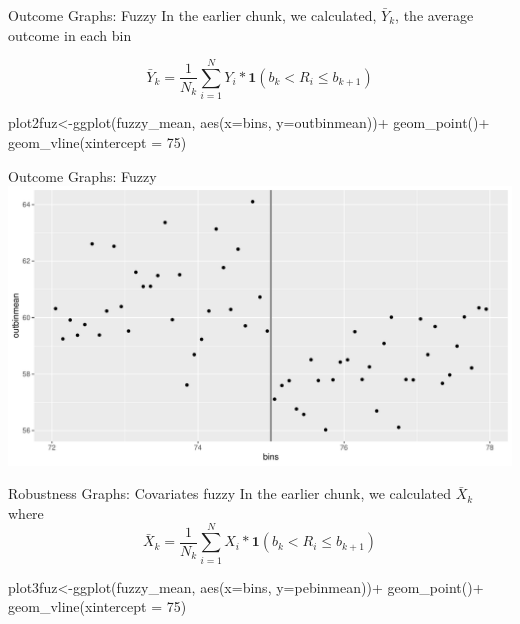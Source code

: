\documentclass[
  ignorenonframetext,
]{beamer}
\newenvironment{Shaded}{\begin{snugshade}}{\end{snugshade}}
\newcommand{\AttributeTok}[1]{\textcolor[rgb]{0.77,0.63,0.00}{#1}}
\newcommand{\DecValTok}[1]{\textcolor[rgb]{0.00,0.00,0.81}{#1}}
\newcommand{\FunctionTok}[1]{\textcolor[rgb]{0.00,0.00,0.00}{#1}}
\newcommand{\NormalTok}[1]{#1}
\newcommand{\OtherTok}[1]{\textcolor[rgb]{0.56,0.35,0.01}{#1}}
\newcommand{\SpecialCharTok}[1]{\textcolor[rgb]{0.00,0.00,0.00}{#1}}
\begin{document}
\begin{frame}[fragile]{Outcome Graphs: Fuzzy}
\protect\hypertarget{outcome-graphs-fuzzy}{}
In the earlier chunk, we calculated, \(\bar{Y}_k\), the average outcome
in each bin

\[
\bar{Y}_k=\frac{1}{N_k}\sum_{i=1}^NY_i*\mathbf{1}(b_k<R_i\leq b_{k+1})
\]

\begin{Shaded}
\begin{Highlighting}[]
\NormalTok{plot2fuz}\OtherTok{\textless{}{-}}\FunctionTok{ggplot}\NormalTok{(fuzzy\_mean, }\FunctionTok{aes}\NormalTok{(}\AttributeTok{x=}\NormalTok{bins, }\AttributeTok{y=}\NormalTok{outbinmean))}\SpecialCharTok{+} 
         \FunctionTok{geom\_point}\NormalTok{()}\SpecialCharTok{+}
         \FunctionTok{geom\_vline}\NormalTok{(}\AttributeTok{xintercept =} \DecValTok{75}\NormalTok{)}
\end{Highlighting}
\end{Shaded}
\end{frame}

\begin{frame}{Outcome Graphs: Fuzzy}
\protect\hypertarget{outcome-graphs-fuzzy-1}{}
\includegraphics{Slides9_RD_files/figure-beamer/fuz3b-1.pdf}
\end{frame}

\begin{frame}[fragile]{Robustness Graphs: Covariates fuzzy}
\protect\hypertarget{robustness-graphs-covariates-fuzzy}{}
In the earlier chunk, we calculated \(\bar{X}_k\) where \[
\bar{X}_k=\frac{1}{N_k}\sum_{i=1}^NX_i*\mathbf{1}(b_k<R_i\leq b_{k+1})
\]

\tiny

\begin{Shaded}
\begin{Highlighting}[]
\NormalTok{plot3fuz}\OtherTok{\textless{}{-}}\FunctionTok{ggplot}\NormalTok{(fuzzy\_mean, }\FunctionTok{aes}\NormalTok{(}\AttributeTok{x=}\NormalTok{bins, }\AttributeTok{y=}\NormalTok{pebinmean))}\SpecialCharTok{+} 
         \FunctionTok{geom\_point}\NormalTok{()}\SpecialCharTok{+}
         \FunctionTok{geom\_vline}\NormalTok{(}\AttributeTok{xintercept =} \DecValTok{75}\NormalTok{)}
\end{Highlighting}
\end{Shaded}
\end{frame}
\end{document}
